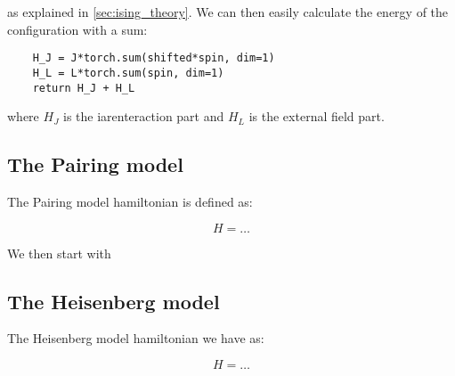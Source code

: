 as explained in \ref{sec:ising_theory}. We can then easily calculate the energy of the configuration with a sum:

\begin{verbatim}
    H_J = J*torch.sum(shifted*spin, dim=1)
    H_L = L*torch.sum(spin, dim=1)
    return H_J + H_L
\end{verbatim}

where $H_J$ is the iarenteraction part and $H_L$ is the external field part.

\subsection{The Pairing model}

The Pairing model hamiltonian is defined as:

\begin{equation}
  H = \dots
  \label{eq:Pairing_model_imp}
\end{equation}

We then start with

\subsection{The Heisenberg model}

The Heisenberg model hamiltonian we have as:

\begin{equation}
  H = \dots
  \label{eq:Heisenberg_model_imp}
\end{equation}


